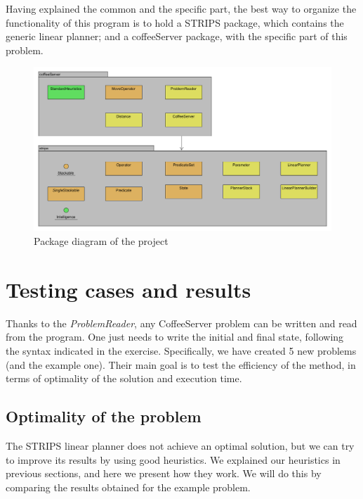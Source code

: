 \documentclass[12pt,a4paper,oneside]{article}
\numberwithin{equation}{section}
\numberwithin{equation}{section}
\theoremstyle{definition}
\begin{document}
Having explained the common and the specific part, the best way to organize the functionality of this program is to hold a STRIPS package, which contains the generic linear planner; and a coffeeServer package, with the specific part of this problem.

\begin{figure}[H]
	\centering
	\includegraphics[scale=0.3]{figures/package_diagram.png}
	\caption{Package diagram of the project}
	\label{package_d} 
\end{figure}

\section{Testing cases and results}
Thanks to the \textit{ProblemReader}, any CoffeeServer problem can be written and read from the program. One just needs to write the initial and final state, following the syntax indicated in the exercise. Specifically, we have created 5 new problems (and the example one). Their main goal is to test the efficiency of the method, in terms of optimality of the solution and execution time.

\subsection{Optimality of the problem}
The STRIPS linear planner does not achieve an optimal solution, but we can try to improve its results by using good heuristics. We explained our heuristics in previous sections, and here we present how they work. We will do this by comparing the results obtained for the example problem.
\end{document}
